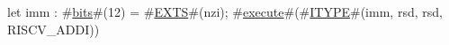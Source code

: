 let imm : #\hyperref[sailRISCVzbits]{bits}#(12) = #\hyperref[sailRISCVzEXTS]{EXTS}#(nzi);
#\hyperref[sailRISCVzexecute]{execute}#(#\hyperref[sailRISCVzITYPE]{ITYPE}#(imm, rsd, rsd, RISCV_ADDI))
